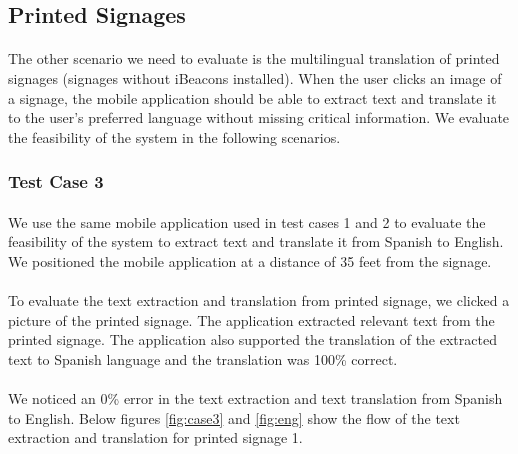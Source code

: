 \documentclass[12pt]{article}
\begin{document}
\subsection{Printed Signages }
\label{twoone}
\paragraph{}The other scenario we need to evaluate is the multilingual translation of printed signages (signages without iBeacons installed). When the user clicks an image of a signage, the mobile application should be able to extract text and translate it to the user's preferred language without missing critical information. We evaluate the feasibility of the system in the following scenarios.

\subsubsection{Test Case 3}
\label{threetwo}
\paragraph{}We use the same mobile application used in test cases 1 and 2 to evaluate the feasibility of the system to extract text and translate it from Spanish to English. We positioned the mobile application at a distance of 35 feet from the signage.

\paragraph{}To evaluate the text extraction and translation from printed signage, we clicked a picture of the printed signage. The application extracted relevant text from the printed signage. The application also supported the translation of the extracted text to Spanish language and the translation was 100\% correct.

\paragraph{}We noticed an 0\% error in the text extraction and text translation from Spanish to English. Below figures  \ref{fig:case3} and \ref{fig:eng} show the flow of the text extraction and translation for printed signage 1.
\end{document}
